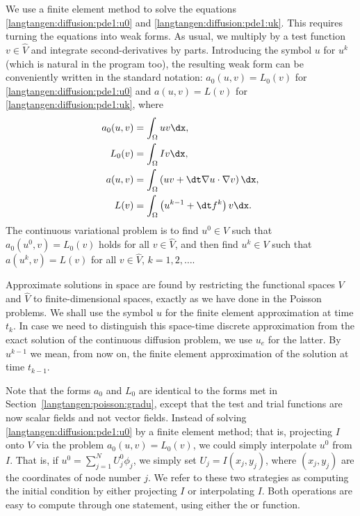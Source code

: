 We use a finite element method to solve the
equations \eqref{langtangen:diffusion:pde1:u0} and
\eqref{langtangen:diffusion:pde1:uk}.  This requires turning the equations
into weak forms.  As usual, we multiply by a test function $v\in \hat V$
and integrate second-derivatives by parts. Introducing the symbol $u$
for $u^k$ (which is natural in the program too), the resulting weak form
can be conveniently written in the standard notation: $a_0(u,v)=L_0(v)$
for \eqref{langtangen:diffusion:pde1:u0} and $a(u,v)=L(v)$ for
\eqref{langtangen:diffusion:pde1:uk}, where
\begin{align}
a_0(u,v) &= \int_\Omega uv\dx,
\label{langtangen:diffusion:pde1:a0}
\\
L_0(v) &= \int_\Omega Iv\dx,
\label{langtangen:diffusion:pde1:L0}
\\
a(u,v) &= \int_\Omega\left( uv + {\dt} \nabla u\cdot \nabla v\right)\dx,
\label{langtangen:diffusion:pde1:a}
\\
L(v) &= \int_\Omega \left(u^{k-1} + {\dt}  f^k\right)v\dx.
\label{langtangen:diffusion:pde1:L}
\end{align}
The continuous variational problem is to find $u^0\in V$ such that
$a_0(u^0,v)=L_0(v)$ holds for all $v\in\hat V$, and then find $u^k\in V$
such that $a(u^k,v)=L(v)$ for all $v\in\hat V$, $k=1,2,\ldots$.

Approximate solutions in space are found by restricting the functional
spaces $V$ and $\hat V$ to finite-dimensional spaces, exactly as we have
done in the Poisson problems.  We shall use the symbol $u$ for the finite
element approximation at time $t_k$. In case we need to distinguish
this space-time discrete approximation from the exact solution of the
continuous diffusion problem, we use $u_e$ for the latter.  By $u^{k-1}$
we mean, from now on, the finite element approximation of the solution
at time $t_{k-1}$.

Note that the forms $a_0$ and $L_0$ are identical to the forms met in
Section~\ref{langtangen:poisson:gradu}, except that the test and trial
functions are now scalar fields and not vector fields.  Instead of
solving \eqref{langtangen:diffusion:pde1:u0} by a finite element method;
that is, projecting $I$ onto $V$ via the problem $a_0(u,v)=L_0(v)$, we
could simply interpolate $u^0$ from $I$. That is, if $u^0=\sum_{j=1}^N
U^0_j\phi_j$, we simply set $U_j=I(x_j,y_j)$, where $(x_j,y_j)$ are
the coordinates of node number $j$. We refer to these two strategies as
computing the initial condition by either projecting $I$ or interpolating
$I$.  Both operations are easy to compute through one statement, using
either the  or  function.

